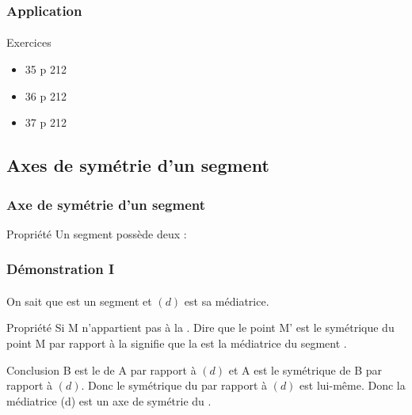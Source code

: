\documentclass{beamer}
\begin{document}
\begin{frame}
\frametitle{Application}  
\framesubtitle{}

\begin{block}{Exercices}
	\begin{itemize}
		\item 35 p 212
		\item 36 p 212
		\item 37 p 212
	\end{itemize}
\end{block}
	
\end{frame}

\subsection{Axes de symétrie d'un segment}

\begin{frame}
\frametitle{Axe de symétrie d'un segment}  


\begin{alertblock}{Propriété}
	Un segment possède deux \asyms :
	\begin{itemize}
	\end{itemize}
\end{alertblock}

\end{frame}

\begin{frame}
	\frametitle{Démonstration I}  
	\framesubtitle{}

\begin{block}{On sait que}
 est un segment et $(d)$ est sa médiatrice.\pause
\end{block}

\begin{block}{Propriété}
	Si M n'appartient pas à la .
	Dire que le point M' est le symétrique du point M par rapport à la  signifie que la  est la médiatrice du segment .\pause
\end{block}

\begin{block}{Conclusion}
	B est le \sym  de A par rapport à $(d)$ et A est le symétrique de B par rapport à $(d)$.
	Donc le symétrique du  par rapport à $(d)$ est lui-même.
	Donc la médiatrice (d) est un axe de symétrie du .
\end{block}
\end{frame}
\end{document}
